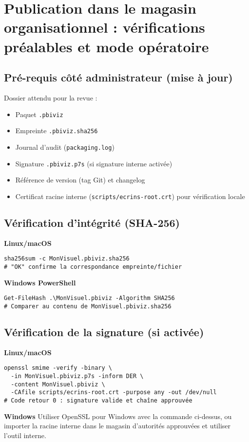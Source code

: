 \section{Publication dans le magasin organisationnel : vérifications préalables et mode opératoire}
\label{ann:org-store-procedure}

\subsection{Pré-requis côté administrateur (mise à jour)}
Dossier attendu pour la revue :
\begin{itemize}
  \item Paquet \texttt{.pbiviz}
  \item Empreinte \texttt{.pbiviz.sha256}
  \item Journal d’audit (\texttt{packaging.log})
  \item Signature \texttt{.pbiviz.p7s} (si signature interne activée)
  \item Référence de version (tag Git) et changelog
  \item Certificat racine interne (\texttt{scripts/ecrins-root.crt}) pour vérification locale
\end{itemize}

\subsection{Vérification d’intégrité (SHA-256)}
\textbf{Linux/macOS}
\begin{verbatim}
sha256sum -c MonVisuel.pbiviz.sha256
# "OK" confirme la correspondance empreinte/fichier
\end{verbatim}
\textbf{Windows PowerShell}
\begin{verbatim}
Get-FileHash .\MonVisuel.pbiviz -Algorithm SHA256
# Comparer au contenu de MonVisuel.pbiviz.sha256
\end{verbatim}

\subsection{Vérification de la signature (si activée)}
\textbf{Linux/macOS}
\begin{verbatim}
openssl smime -verify -binary \
  -in MonVisuel.pbiviz.p7s -inform DER \
  -content MonVisuel.pbiviz \
  -CAfile scripts/ecrins-root.crt -purpose any -out /dev/null
# Code retour 0 : signature valide et chaîne approuvée
\end{verbatim}
\textbf{Windows}
Utiliser OpenSSL pour Windows avec la commande ci-dessus, ou importer la racine interne
dans le magasin d’autorités approuvées et utiliser l’outil interne.
